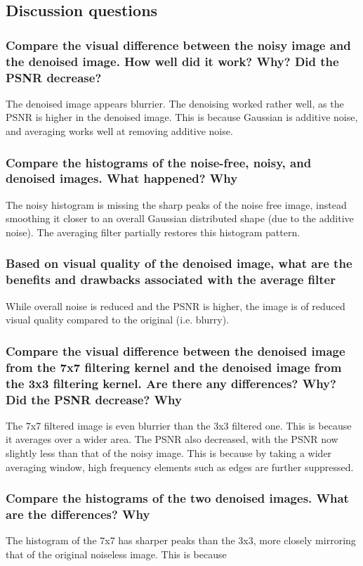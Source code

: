 \documentclass[article, 1.5space, letterpaper, 12pt, oneside, header, footer]{SydeClass}
\begin{document}
\clearpage


\subsection{Discussion questions}

\subsubsection{Compare the visual difference between the noisy image and the denoised image. How well did it
work? Why? Did the PSNR decrease?}
The denoised image appears blurrier. The denoising worked rather well, as the PSNR is higher in the denoised image. This is because Gaussian is additive noise, and averaging works well at removing additive noise.

\subsubsection{Compare the histograms of the noise-free, noisy, and denoised images. What happened? Why}
The noisy histogram is missing the sharp peaks of the noise free image, instead smoothing it closer to an overall Gaussian distributed shape (due to the additive noise). The averaging filter partially restores this histogram pattern.


\subsubsection{Based on visual quality of the denoised image, what are the benefits and drawbacks associated with
the average filter}
While overall noise is reduced and the PSNR is higher, the image is of reduced visual quality compared to the original (i.e. blurry).


\subsubsection{Compare the visual difference between the denoised image from the 7x7 filtering kernel and the
denoised image from the 3x3 filtering kernel. Are there any differences? Why? Did the PSNR
decrease? Why}
The 7x7 filtered image is even blurrier than the 3x3 filtered one. This is because it averages over a wider area. The PSNR also decreased, with the PSNR now slightly less than that of the noisy image. This is because by taking a wider averaging window, high frequency elements such as edges are further suppressed.


\subsubsection{Compare the histograms of the two denoised images. What are the differences? Why}
The histogram of the 7x7 has sharper peaks than the 3x3, more closely mirroring that of the original noiseless image. This is because
\end{document}
